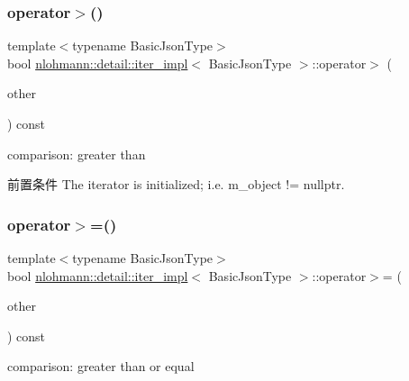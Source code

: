\subsubsection{\texorpdfstring{operator$>$()}{operator>()}}
{\footnotesize\ttfamily template$<$typename Basic\+Json\+Type$>$ \\
bool \mbox{\hyperlink{classnlohmann_1_1detail_1_1iter__impl}{nlohmann\+::detail\+::iter\+\_\+impl}}$<$ Basic\+Json\+Type $>$\+::operator$>$ (\begin{DoxyParamCaption}\item[{const \mbox{\hyperlink{classnlohmann_1_1detail_1_1iter__impl}{iter\+\_\+impl}}$<$ Basic\+Json\+Type $>$ \&}]{other }\end{DoxyParamCaption}) const\hspace{0.3cm}{\ttfamily [inline]}}



comparison\+: greater than 

\begin{DoxyPrecond}{前置条件}
The iterator is initialized; i.\+e. {\ttfamily m\+\_\+object != nullptr}. 
\end{DoxyPrecond}
\mbox{\label{classnlohmann_1_1detail_1_1iter__impl_a634f85da575cb60b012a687efa26e11a}} 
\subsubsection{\texorpdfstring{operator$>$=()}{operator>=()}}
{\footnotesize\ttfamily template$<$typename Basic\+Json\+Type$>$ \\
bool \mbox{\hyperlink{classnlohmann_1_1detail_1_1iter__impl}{nlohmann\+::detail\+::iter\+\_\+impl}}$<$ Basic\+Json\+Type $>$\+::operator$>$= (\begin{DoxyParamCaption}\item[{const \mbox{\hyperlink{classnlohmann_1_1detail_1_1iter__impl}{iter\+\_\+impl}}$<$ Basic\+Json\+Type $>$ \&}]{other }\end{DoxyParamCaption}) const\hspace{0.3cm}{\ttfamily [inline]}}



comparison\+: greater than or equal 

